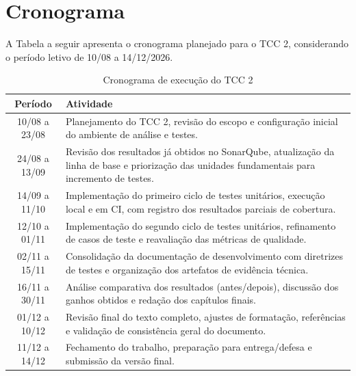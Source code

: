 \section{Cronograma}

A Tabela a seguir apresenta o cronograma planejado para o TCC 2, considerando o período letivo de 10/08 a 14/12/2026.

\begin{table}[h]
\centering
\caption{Cronograma de execução do TCC 2}
\begin{tabular}{|c|p{10cm}|}
\hline
\textbf{Período} & \textbf{Atividade} \\ \hline
10/08 a 23/08 & Planejamento do TCC 2, revisão do escopo e configuração inicial do ambiente de análise e testes. \\ \hline
24/08 a 13/09 & Revisão dos resultados já obtidos no SonarQube, atualização da linha de base e priorização das unidades fundamentais para incremento de testes. \\ \hline
14/09 a 11/10 & Implementação do primeiro ciclo de testes unitários, execução local e em CI, com registro dos resultados parciais de cobertura. \\ \hline
12/10 a 01/11 & Implementação do segundo ciclo de testes unitários, refinamento de casos de teste e reavaliação das métricas de qualidade. \\ \hline
02/11 a 15/11 & Consolidação da documentação de desenvolvimento com diretrizes de testes e organização dos artefatos de evidência técnica. \\ \hline
16/11 a 30/11 & Análise comparativa dos resultados (antes/depois), discussão dos ganhos obtidos e redação dos capítulos finais. \\ \hline
01/12 a 10/12 & Revisão final do texto completo, ajustes de formatação, referências e validação de consistência geral do documento. \\ \hline
11/12 a 14/12 & Fechamento do trabalho, preparação para entrega/defesa e submissão da versão final. \\ \hline
\end{tabular}
\end{table}


